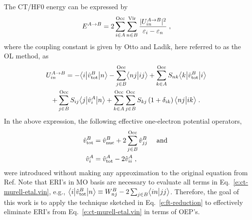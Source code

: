 \documentclass[aip,jcp,amsmath,amssymb,reprint,floatfix]{revtex4-1}
\begin{document}
The CT/HF0 energy can be expressed
by\cite{Murrell.Randic.Williams.Longuet-Higgins.ProcRSocLondA.1965,Otto.Ladik.ChemPhys.1975}
%
\begin{equation} \label{e:ct-murell-etal.e}
 E^{A\rightarrow B} = 2 \sum_{i\in A}^{\rm Occ} \sum_{n\in B}^{\rm Vir} 
  \frac{\vert U^{A\rightarrow B}_{in} \vert^2 }{\varepsilon_i - \varepsilon_n} \;,
\end{equation}
%
%
where the coupling constant is given by Otto and Ladik,\cite{Otto.Ladik.ChemPhys.1975}
here referred to as the OL method, as
%
\begin{multline} \label{e:ct-murell-etal.vin}
 U^{A\rightarrow B}_{in} = 
      - \bigl\langle {i} \bigl\lvert {\hat{v}^B_{\rm tot} } \bigl\lvert {n} \bigr\rangle 
      - \sum_{j\in B}^{\rm Occ} \bigl\langle {nj} \bigl\lvert {ij} \bigr\rangle 
      + \sum_{k\in A}^{\rm Occ} S_{nk} \bigl\langle {k} \bigl\lvert {\hat{v}^B_{\rm tot} } \bigl\lvert {i} \bigr\rangle \\
      + \sum_{j\in B}^{\rm Occ} S_{ij} \bigl\langle {j} \bigl\lvert {\hat{v}^A_{i} } \bigl\lvert {n} \bigr\rangle  
     + \sum_{k\in A}^{\rm Occ} \sum_{j\in B}^{\rm Occ}  
        S_{kj} \left(1+\delta_{ik}\right) \bigl\langle {nj} \bigl\lvert {ik} \bigr\rangle \;.
\end{multline}
%
In the above expression, the following effective one\hyp{}electron potential operators,
%
\begin{subequations} 
\begin{align} \label{e:ct-murell-etal.vtot-vi}
 \hat{v}^B_{\rm tot} &= \hat{v}^B_{\rm nuc} + 2\sum_{j\in B}^{\rm Occ} \hat{v}^B_{jj} \quad\text{ and }\\ 
 \hat{v}^A_{i      } &= \hat{v}^A_{\rm tot} - 2\hat{v}^A_{ii} \;,
\end{align}
\end{subequations}
%
were introduced without making any approximation to the original equation
from Ref.\cite{Otto.Ladik.ChemPhys.1975} 
Note that ERI's in MO basis are necessary to evaluate all terms
in Eq.~\eqref{e:ct-murell-etal.vin}, e.g., 
$\bigl\langle {i} \bigl\lvert {\hat{v}^B_{\rm tot} } \bigl\lvert {n} \bigr\rangle \equiv W^B_{nj} - 
2\sum_{j\in B}\bigl\langle {in} \bigl\lvert {jj} \bigr\rangle$.
Therefore, the goal of this work is to apply the technique sketched in Eq.~\eqref{e:ft-reduction}
to effectively eliminate ERI's from Eq.~\eqref{e:ct-murell-etal.vin} in terms of OEP's.
\end{document}

